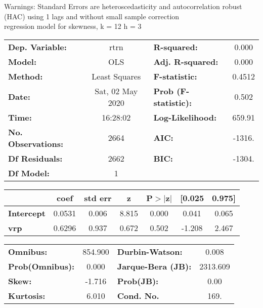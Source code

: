 Warnings: \newline
 [1] Standard Errors are heteroscedasticity and autocorrelation robust (HAC) using 1 lags and without small sample correction\\ 

regression model for skewness, k = 12 h = 3\begin{center}
\begin{tabular}{lclc}
\toprule
\textbf{Dep. Variable:}    &       rtrn       & \textbf{  R-squared:         } &     0.000   \\
\textbf{Model:}            &       OLS        & \textbf{  Adj. R-squared:    } &     0.000   \\
\textbf{Method:}           &  Least Squares   & \textbf{  F-statistic:       } &    0.4512   \\
\textbf{Date:}             & Sat, 02 May 2020 & \textbf{  Prob (F-statistic):} &    0.502    \\
\textbf{Time:}             &     16:28:02     & \textbf{  Log-Likelihood:    } &    659.91   \\
\textbf{No. Observations:} &        2664      & \textbf{  AIC:               } &    -1316.   \\
\textbf{Df Residuals:}     &        2662      & \textbf{  BIC:               } &    -1304.   \\
\textbf{Df Model:}         &           1      & \textbf{                     } &             \\
\bottomrule
\end{tabular}
\begin{tabular}{lcccccc}
                   & \textbf{coef} & \textbf{std err} & \textbf{z} & \textbf{P$> |$z$|$} & \textbf{[0.025} & \textbf{0.975]}  \\
\midrule
\textbf{Intercept} &       0.0531  &        0.006     &     8.815  &         0.000        &        0.041    &        0.065     \\
\textbf{vrp}       &       0.6296  &        0.937     &     0.672  &         0.502        &       -1.208    &        2.467     \\
\bottomrule
\end{tabular}
\begin{tabular}{lclc}
\textbf{Omnibus:}       & 854.900 & \textbf{  Durbin-Watson:     } &    0.008  \\
\textbf{Prob(Omnibus):} &   0.000 & \textbf{  Jarque-Bera (JB):  } & 2313.609  \\
\textbf{Skew:}          &  -1.716 & \textbf{  Prob(JB):          } &     0.00  \\
\textbf{Kurtosis:}      &   6.010 & \textbf{  Cond. No.          } &     169.  \\
\bottomrule
\end{tabular}
\end{center}

